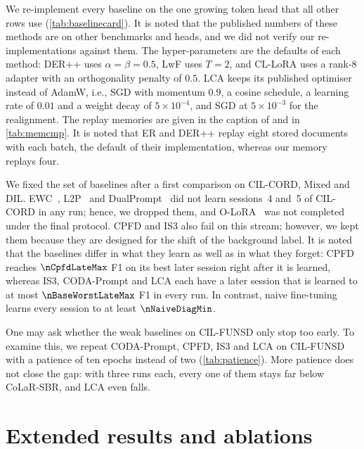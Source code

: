  We re-implement every baseline on the one growing token head that all other rows use (\cref{tab:baselinecard}). It is noted that the published numbers of these methods are on other benchmarks and heads, and we did not verify our re-implementations against them. The hyper-parameters are the defaults of each method: DER++ uses $\alpha{=}\beta{=}0.5$, LwF uses $T{=}2$, and CL-LoRA uses a rank-$8$ adapter with an orthogonality penalty of $0.5$. LCA keeps its published optimiser instead of AdamW, i.e., SGD with momentum $0.9$, a cosine schedule, a learning rate of $0.01$ and a weight decay of $5{\times}10^{-4}$, and SGD at $5{\times}10^{-3}$ for the realignment. The replay memories are given in the caption of  and in \cref{tab:memcmp}. It is noted that ER and DER++ replay eight stored documents with each batch, the default of their implementation, whereas our memory replays four.

 We fixed the set of baselines after a first comparison on CIL-CORD, Mixed and DIL. EWC~\citep{kirkpatrick2017ewc}, L2P~\citep{wang2022l2p} and DualPrompt~\citep{wang2022dualprompt} did not learn sessions~4 and~5 of CIL-CORD in any run; hence, we dropped them, and O-LoRA~\citep{wang2023olora} was not completed under the final protocol. CPFD and IS3 also fail on this stream; however, we kept them because they are designed for the shift of the background label. It is noted that the baselines differ in what they learn as well as in what they forget: CPFD reaches $\nCpfdLateMax$ F1 on its best later session right after it is learned, whereas IS3, CODA-Prompt and LCA each have a later session that is learned to at most $\nBaseWorstLateMax$ F1 in every run. In contrast, naive fine-tuning learns every session to at least $\nNaiveDiagMin$.

 One may ask whether the weak baselines on CIL-FUNSD only stop too early. To examine this, we repeat CODA-Prompt, CPFD, IS3 and LCA on CIL-FUNSD with a patience of ten epochs instead of two (\cref{tab:patience}). More patience does not close the gap: with three runs each, every one of them stays far below CoLaR-SBR, and LCA even falls.

\section{Extended results and ablations}
\label{app:results}

